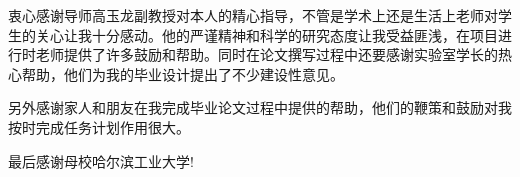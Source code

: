 \begin{acknowledgements}
衷心感谢导师高玉龙副教授对本人的精心指导，不管是学术上还是生活上老师对学生的关心让我十分感动。他的严谨精神和科学的研究态度让我受益匪浅，在项目进行时老师提供了许多鼓励和帮助。同时在论文撰写过程中还要感谢实验室学长的热心帮助，他们为我的毕业设计提出了不少建设性意见。

另外感谢家人和朋友在我完成毕业论文过程中提供的帮助，他们的鞭策和鼓励对我按时完成任务计划作用很大。

最后感谢母校哈尔滨工业大学!

\end{acknowledgements}